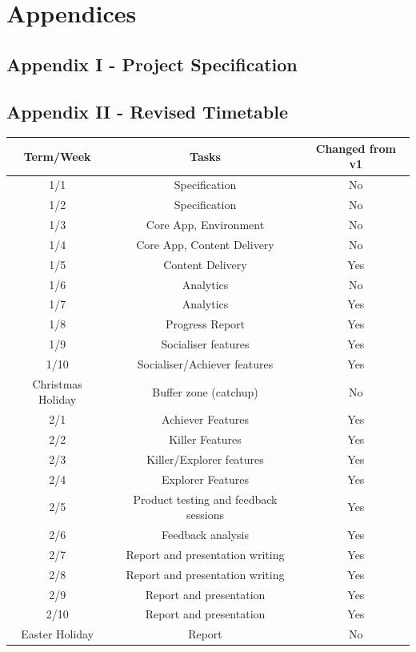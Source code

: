 \documentclass[10pt,a4paper]{report}
\begin{document}
\section*{Appendices}

\subsection*{Appendix I - Project Specification}


\subsection*{Appendix II - Revised Timetable}
\begin{tabular}{|c|c|c|}
	\hline Term/Week & Tasks & Changed from v1 \\ 
	\hline 1/1 & Specification & No \\ 
	\hline 1/2 & Specification & No \\ 
	\hline 1/3 & Core App, Environment & No \\ 
	\hline 1/4 & Core App, Content Delivery & No \\
	\hline 1/5 & Content Delivery & Yes \\
	\hline 1/6 & Analytics & No \\ 
	\hline 1/7 & Analytics & Yes \\    
	\hline 1/8 & Progress Report & Yes \\
	\hline 1/9 & Socialiser features & Yes \\
	\hline 1/10 & Socialiser/Achiever features & Yes \\
	\hline Christmas Holiday & Buffer zone (catchup) & No \\
	\hline 2/1 & Achiever Features & Yes \\ 
	\hline 2/2 & Killer Features & Yes \\ 
	\hline 2/3 & Killer/Explorer features & Yes \\ 
	\hline 2/4 & Explorer Features & Yes \\ 
	\hline 2/5 & Product testing and feedback sessions & Yes \\ 
	\hline 2/6 & Feedback analysis & Yes \\ 
	\hline 2/7 & Report and presentation writing & Yes \\ 
	\hline 2/8 & Report and presentation writing & Yes \\ 
	\hline 2/9 & Report and presentation & Yes \\ 
	\hline 2/10 & Report and presentation & Yes \\
	\hline Easter Holiday & Report & No \\
	\hline 
\end{tabular}
\end{document}
